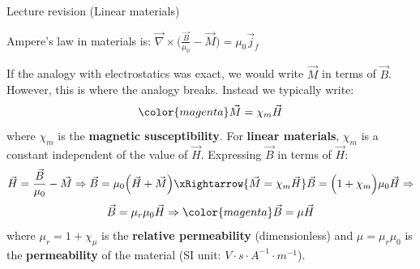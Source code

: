 %
%
%

\begin{frame}{Lecture \summarizedlecture revision (Linear materials)}

Ampere's law in materials is:
$\displaystyle \vec{\nabla} \times \Big( \frac{\vec{B}}{\mu_0} - \vec{M} \Big) = \mu_0 \vec{j}_{f}$\\
\vspace{0.1cm}

If the analogy with electrostatics was exact,
we would write $\vec{M}$ in terms of $\vec{B}$.
However, this is where the analogy breaks.
Instead we typically write:
\begin{equation*}
{\color{magenta}
  \vec{M} = \chi_{m} \vec{H}
}
\end{equation*}
where  $\chi_m$ is the {\bf magnetic susceptibility}.
For {\bf linear materials}, $\chi_m$ is a constant independent of the value of $\vec{H}$.
Expressing $\vec{B}$ in terms of $\vec{H}$:
\begin{equation*}
  \vec{H} = \frac{\vec{B}}{\mu_0} - \vec{M} \Rightarrow
  \vec{B} = \mu_0 \Big( \vec{H} + \vec{M} \Big) \xRightarrow{\vec{M} = \chi_{m} \vec{H}}
  \vec{B} = \Big(1 + \chi_{m} \Big) \mu_0  \vec{H} \Rightarrow
\end{equation*}
\begin{equation*}
  \vec{B} = \mu_r \mu_0 \vec{H} \Rightarrow
  {\color{magenta}
    \vec{B} = \mu \vec{H}
  }
\end{equation*}
where $\mu_r = 1+\chi_{\mu}$
is the {\bf relative permeability} (dimensionless) and
$\mu = \mu_r  \mu_0$ is the {\bf permeability} of the material
(SI unit: $V \cdot s \cdot  A^{-1} \cdot m^{-1}$).\\

\end{frame}

%
%
%


